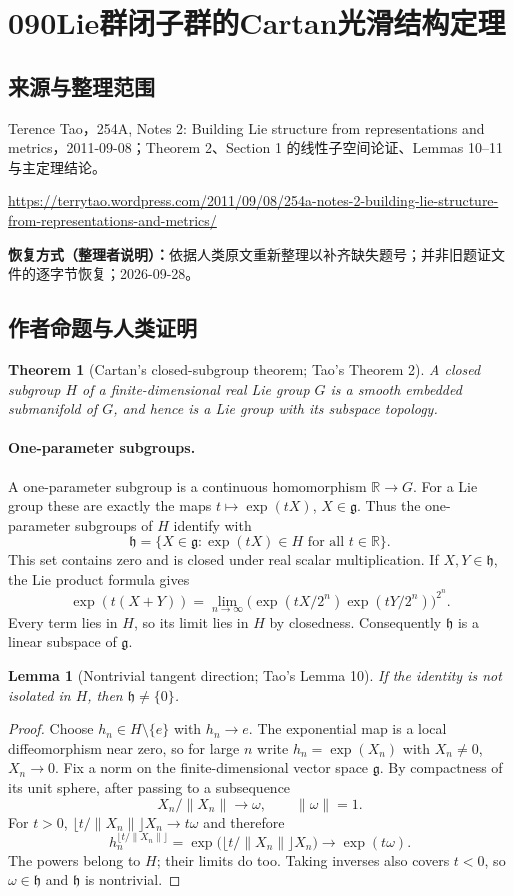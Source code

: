 \documentclass[UTF8,11pt]{ctexart}
\newtheorem*{theorem}{Theorem}
\newtheorem*{lemma}{Lemma}
\theoremstyle{definition}
\newcommand{\R}{\mathbb R}
\begin{document}
\section*{090\quad Lie群闭子群的Cartan光滑结构定理}
\subsection*{来源与整理范围}
Terence Tao，254A, Notes 2: Building Lie structure from representations and metrics，2011-09-08；Theorem 2、Section 1 的线性子空间论证、Lemmas 10--11 与主定理结论。
\par\url{https://terrytao.wordpress.com/2011/09/08/254a-notes-2-building-lie-structure-from-representations-and-metrics/}
\par\textbf{恢复方式（整理者说明）：}依据人类原文重新整理以补齐缺失题号；并非旧题证文件的逐字节恢复；2026-09-28。
\subsection*{作者命题与人类证明}

\begin{theorem}[Cartan's closed-subgroup theorem; Tao's Theorem 2]
A closed subgroup $H$ of a finite-dimensional real Lie group $G$ is a
smooth embedded submanifold of $G$, and hence is a Lie group with its
subspace topology.
\end{theorem}
\paragraph{One-parameter subgroups.}
A one-parameter subgroup is a continuous homomorphism $\R\to G$.
For a Lie group these are exactly the maps $t\mapsto\exp(tX)$,
$X\in\mathfrak g$. Thus the one-parameter subgroups of $H$ identify with
\[
 \mathfrak h=\{X\in\mathfrak g:\exp(tX)\in H\text{ for all }t\in\R\}.
\]
This set contains zero and is closed under real scalar multiplication.
If $X,Y\in\mathfrak h$, the Lie product formula gives
\[
 \exp(t(X+Y))=
 \lim_{n\to\infty}\bigl(\exp(tX/2^n)\exp(tY/2^n)\bigr)^{2^n}.
\]
Every term lies in $H$, so its limit lies in $H$ by closedness.
Consequently $\mathfrak h$ is a linear subspace of $\mathfrak g$.

\begin{lemma}[Nontrivial tangent direction; Tao's Lemma 10]
If the identity is not isolated in $H$, then $\mathfrak h\ne\{0\}$.
\end{lemma}
\begin{proof}
Choose $h_n\in H\setminus\{e\}$ with $h_n\to e$.
The exponential map is a local diffeomorphism near zero, so for large $n$
write $h_n=\exp(X_n)$ with $X_n\ne0$, $X_n\to0$.
Fix a norm on the finite-dimensional vector space $\mathfrak g$.
By compactness of its unit sphere, after passing to a subsequence
\[
 X_n/\|X_n\|\longrightarrow\omega,\qquad\|\omega\|=1.
\]
For $t>0$,
$\lfloor t/\|X_n\|\rfloor X_n\to t\omega$ and therefore
\[
 h_n^{\lfloor t/\|X_n\|\rfloor}
 =\exp\bigl(\lfloor t/\|X_n\|\rfloor X_n\bigr)
 \longrightarrow\exp(t\omega).
\]
The powers belong to $H$; their limits do too. Taking inverses also covers
$t<0$, so $\omega\in\mathfrak h$ and $\mathfrak h$ is nontrivial.
\end{proof}
\end{document}
